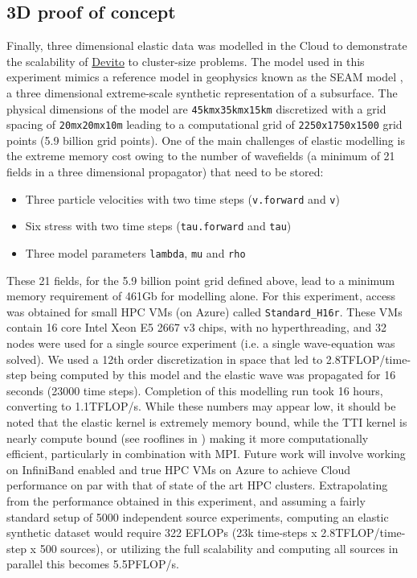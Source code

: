 \documentclass[conference]{IEEEtran}
\begin{document}
\subsection{3D proof of concept}\label{d-proof-of-concept}

Finally, three dimensional elastic data was modelled in the Cloud to
demonstrate the scalability of \href{https://github.com/devitocodes/devito}{Devito} to cluster-size problems. The model
used in this experiment mimics a reference model in geophysics known as
the SEAM model \cite{fehler2011seam}, a three dimensional extreme-scale
synthetic representation of a subsurface. The physical dimensions of the
model are \texttt{45kmx35kmx15km} discretized with a grid spacing of
\texttt{20mx20mx10m} leading to a computational grid of
\texttt{2250x1750x1500} grid points (5.9 billion grid points). One of the
main challenges of elastic modelling is the extreme memory cost owing to
the number of wavefields (a minimum of 21 fields in a three dimensional
propagator) that need to be stored:

\begin{itemize}
\itemsep1pt\parskip0pt
\item
  Three particle velocities with two time steps (\texttt{v.forward} and
  \texttt{v})
\item
  Six stress with two time steps (\texttt{tau.forward} and \texttt{tau})
\item
  Three model parameters \texttt{lambda}, \texttt{mu} and \texttt{rho}
\end{itemize}

These 21 fields, for the 5.9 billion point grid defined above, lead to a
minimum memory requirement of 461Gb for modelling alone. For this experiment,
access was obtained for small HPC VMs (on Azure) called \texttt{Standard\_H16r}.
These VMs contain 16 core Intel Xeon E5 2667 v3 chips, with no hyperthreading,
and 32 nodes were used for a single source experiment
(i.e. a single wave-equation was solved). We
used a 12th order discretization in space that led to 2.8TFLOP/time-step being
computed by this model and the elastic wave was propagated for 16 seconds
(23000 time steps). Completion of this modelling run took 16 hours, converting to
1.1TFLOP/s. While these numbers may appear low, it should be noted that
the elastic kernel is extremely memory bound, while the TTI kernel is nearly
compute bound (see rooflines in \cite{louboutin2016ppf, devito-api, devito-compiler})
making it more computationally efficient, particularly in combination
with MPI. Future work will involve working on InfiniBand enabled and
true HPC VMs on Azure to achieve Cloud performance on par with that of state of
the art HPC clusters. Extrapolating from the performance obtained in this
experiment, and assuming a fairly standard setup of 5000 independent
source experiments, computing an elastic synthetic dataset would require 322
EFLOPs (23k time-steps x 2.8TFLOP/time-step x 500
sources), or utilizing the full scalability and computing all sources in
parallel this becomes 5.5PFLOP/s.
\end{document}
